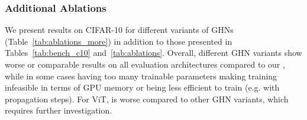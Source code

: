 \subsubsection{Additional Ablations\label{apdx:ablations}}

We present results on CIFAR-10 for different variants of GHNs (Table~\ref{tab:ablations_more}) in addition to those presented in Tables~\ref{tab:bench_c10} and~\ref{tab:ablations}.
Overall, different GHN variants show worse or comparable results on all evaluation architectures compared to our \ghnours, while in some cases having too many trainable parameters making training infeasible in terms of GPU memory or being less efficient to train (e.g. with  propagation steps).
For ViT, \ghnours is worse compared to other GHN variants, which requires further investigation.


